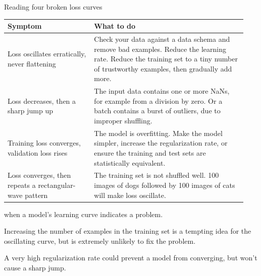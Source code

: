 \begin{frame}{Reading four broken loss curves}
  \begin{withmargin}
    \begin{tdmain}
      \footnotesize
      \begin{tabular}{@{}p{0.34\linewidth}p{0.60\linewidth}@{}}
        \toprule
        \textbf{Symptom} & \textbf{What to do}\\
        \midrule
        Loss oscillates erratically, never flattening
          & Check your data against a data schema and remove bad examples.
            Reduce the learning rate. Reduce the training set to a tiny number
            of trustworthy examples, then gradually add more.\\[0.4em]
        Loss decreases, then a sharp jump up
          & The input data contains one or more NaNs, for example from a
            division by zero. Or a batch contains a burst of outliers, due to
            improper shuffling.\\[0.4em]
        Training loss converges, validation loss rises
          & The model is overfitting. Make the model simpler, increase the
            regularization rate, or ensure the training and test sets are
            statistically equivalent.\\[0.4em]
        Loss converges, then repeats a rectangular-wave pattern
          & The training set is not shuffled well. 100 images of dogs followed
            by 100 images of cats will make loss oscillate.\\
        \bottomrule
      \end{tabular}
    \end{tdmain}
    \begin{tdmargin}
       when a model's learning curve
      indicates a problem.
      \par\medskip
      Increasing the number of examples in the training set is a tempting idea
      for the oscillating curve, but is extremely unlikely to fix the problem.
      \par\medskip
      A very high regularization rate could prevent a model from converging, but
      won't cause a sharp jump.
    \end{tdmargin}
  \end{withmargin}
\end{frame}

